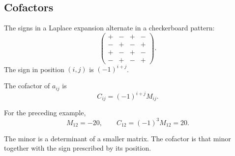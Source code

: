 \subsection{Cofactors}

The signs in a Laplace expansion alternate in a checkerboard pattern:
\[
\begin{pmatrix}
+&-&+&-\\-&+&-&+\\+&-&+&-\\-&+&-&+
\end{pmatrix}.
\]
The sign in position $(i,j)$ is $(-1)^{i+j}$.

\begin{definitionbox}
The cofactor of $a_{ij}$ is
\[
\boxed{C_{ij}=(-1)^{i+j}M_{ij}}.
\]
\end{definitionbox}

For the preceding example,
\[
M_{12}=-20,
\qquad
C_{12}=(-1)^3M_{12}=20.
\]

\begin{remarkbox}
The minor is a determinant of a smaller matrix. The cofactor is that minor together with the sign prescribed by its position.
\end{remarkbox}
